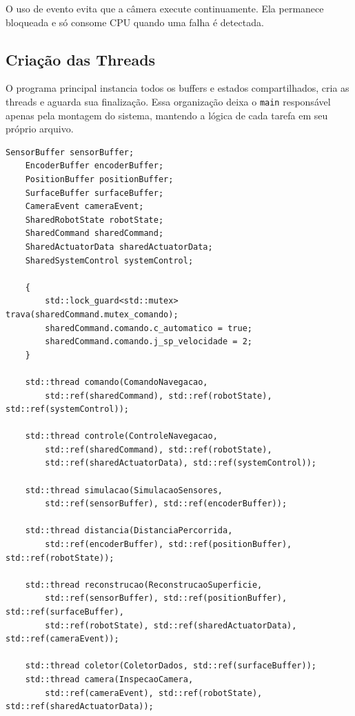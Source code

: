 \documentclass[12pt,a4paper]{article}
\begin{document}
    O uso de evento evita que a câmera execute continuamente. Ela permanece bloqueada e só consome CPU quando uma falha é detectada.

    \subsection{Criação das Threads}

    O programa principal instancia todos os buffers e estados compartilhados, cria as threads e aguarda sua finalização. Essa organização deixa o \texttt{main} responsável apenas pela montagem do sistema, mantendo a lógica de cada tarefa em seu próprio arquivo.

    \begin{lstlisting}[style=cppstyle]
    SensorBuffer sensorBuffer;
    EncoderBuffer encoderBuffer;
    PositionBuffer positionBuffer;
    SurfaceBuffer surfaceBuffer;
    CameraEvent cameraEvent;
    SharedRobotState robotState;
    SharedCommand sharedCommand;
    SharedActuatorData sharedActuatorData;
    SharedSystemControl systemControl;

    {
        std::lock_guard<std::mutex> trava(sharedCommand.mutex_comando);
        sharedCommand.comando.c_automatico = true;
        sharedCommand.comando.j_sp_velocidade = 2;
    }

    std::thread comando(ComandoNavegacao,
        std::ref(sharedCommand), std::ref(robotState), std::ref(systemControl));

    std::thread controle(ControleNavegacao,
        std::ref(sharedCommand), std::ref(robotState),
        std::ref(sharedActuatorData), std::ref(systemControl));

    std::thread simulacao(SimulacaoSensores,
        std::ref(sensorBuffer), std::ref(encoderBuffer));

    std::thread distancia(DistanciaPercorrida,
        std::ref(encoderBuffer), std::ref(positionBuffer), std::ref(robotState));

    std::thread reconstrucao(ReconstrucaoSuperficie,
        std::ref(sensorBuffer), std::ref(positionBuffer), std::ref(surfaceBuffer),
        std::ref(robotState), std::ref(sharedActuatorData), std::ref(cameraEvent));

    std::thread coletor(ColetorDados, std::ref(surfaceBuffer));
    std::thread camera(InspecaoCamera,
        std::ref(cameraEvent), std::ref(robotState), std::ref(sharedActuatorData));
    \end{lstlisting}
\end{document}
